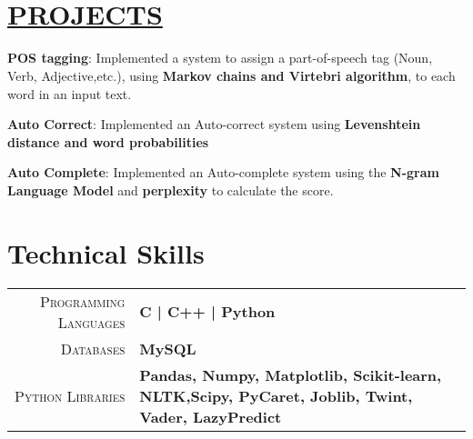 \documentclass[]{deedy-resume-openfont}
\begin{document}
\begin{minipage}[t]{0.66\textwidth}
\\~\\


\section{\href{https://github.com/SPOOKBITE/NLP_PROJECTS}{PROJECTS}}
\vspace{\topsep} %
\begin{tightemize}
\item \textbf{POS tagging}: Implemented a system to assign a part-of-speech tag (Noun, Verb, Adjective,etc.), using \textbf{Markov chains and Virtebri algorithm}, to each word in an input text.
\item \textbf{Auto Correct}: Implemented an Auto-correct system using \textbf{Levenshtein distance and word probabilities}
\item \textbf{Auto Complete}: Implemented an Auto-complete system using the \textbf{N-gram Language Model} and \textbf{perplexity} to calculate the score.

\end{tightemize}
\vspace{\topsep} %


\section{Technical Skills}
\begin{tabular}{r|p{15cm}}
\textsc{Programming Languages} & \textbf{ C | C++ | Python } \\
\textsc{Databases} & \textbf{ MySQL }\\
\textsc{Python Libraries} & \textbf{Pandas, Numpy, Matplotlib, Scikit-learn, NLTK,\newline Scipy, PyCaret, Joblib, Twint, Vader, LazyPredict}\\ 
\end{tabular}

\\~\\



\end{minipage}
\end{document}
